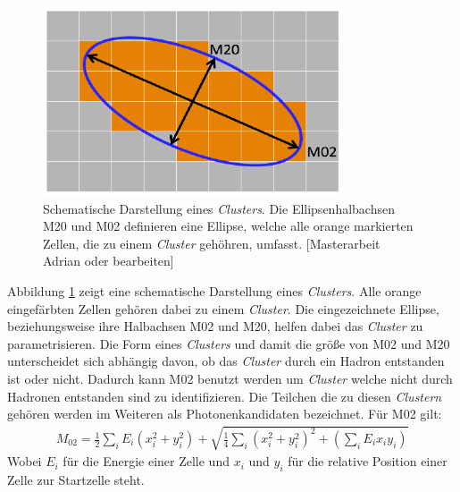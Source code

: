 \begin{figure}[thp]
\centering
\includegraphics[width=.35\linewidth]{m02&m20.png}
\caption{Schematische Darstellung eines \textit{Clusters}. Die Ellipsenhalbachsen M20 und M02 definieren eine Ellipse, welche alle orange markierten Zellen, die zu einem \textit{Cluster} geh\"ohren, umfasst.
[Masterarbeit Adrian oder bearbeiten]}
\label{fig:M20}
\end{figure}

Abbildung \ref{fig:M20} zeigt eine schematische Darstellung eines \textit{Clusters}.
Alle orange eingef\"arbten Zellen geh\"oren dabei zu einem \textit{Cluster}.
Die eingezeichnete Ellipse, beziehungsweise ihre Halbachsen M02 und M20, helfen dabei das \textit{Cluster} zu parametrisieren.
Die Form eines \textit{Clusters} und damit die gr\"o{\ss}e von M02 und M20 unterscheidet sich abh\"angig davon, ob das \textit{Cluster} durch ein Hadron entstanden ist oder nicht.
Dadurch kann M02 benutzt werden um \textit{Cluster} welche nicht durch Hadronen entstanden sind zu identifizieren.
Die Teilchen die zu diesen \textit{Clustern} geh\"oren werden im Weiteren als Photonenkandidaten bezeichnet.
F\"ur M02 gilt:
\begin{align} 
M_{02} = \frac{1}{2}\sum_{i}E_{i}(x_{i}^{2}+y_{i}^{2})+\sqrt{\frac{1}{4}\sum_{i}\left(x_{i}^{2}+y_{i}^{2}\right)^{2}+\left(\sum_{i}E_{i}x_{i}y_{i}\right)}
\end{align}
Wobei $E_{i}$ f\"ur die Energie einer Zelle und $x_{i}$ und $y_{i}$ f\"ur die relative Position einer Zelle zur Startzelle steht.